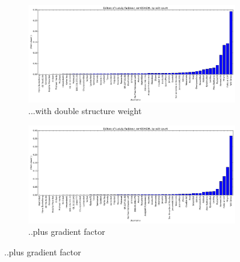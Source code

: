 \begin{figure}
  \centering
  \begin{subfigure}[b]{0.7\linewidth}
    \centering
    \includegraphics[width=\linewidth]{img/weightings/LudvigFaddeevStructure.png}
    \caption{...with double structure weight}
  \end{subfigure}
  \begin{subfigure}[b]{0.7\linewidth}
    \centering
    \includegraphics[width=\linewidth]{img/weightings/LudvigFaddeevStructureGradient.png}
    \caption{..plus gradient factor}
  \end{subfigure}
  
  
\end{figure}
\clearpage
